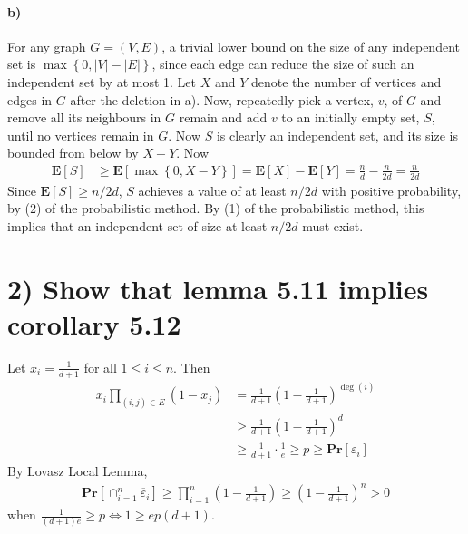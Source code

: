 \documentclass[12pt]{article}
\begin{document}
\paragraph{b)} For any graph $G=(V,E)$, a trivial lower bound on the size of any independent set is $\max\left\{0,|V| - |E|\right\}$, since each edge can reduce the size of such an independent set by at most 1. Let $X$ and $Y$ denote the number of vertices and edges in $G$ after the deletion in a). Now, repeatedly pick a vertex, $v$, of $G$ and remove all its neighbours in $G$ remain and add $v$  to an initially empty set, $S$, until no vertices remain in $G$. Now $S$ is clearly an independent set, and its size is bounded from below by $X-Y$. Now
\begin{align*}
\mathbf{E}\left[ S \right] &\geq \mathbf{E}\left[ \max\left\{0,X-Y\right\} \right] = \mathbf{E}\left[ X \right] - \mathbf{E}\left[ Y \right] = \frac{n}{d} - \frac{n}{2d} = \frac{n}{2d}
\end{align*}
Since $\mathbf{E}\left[ S \right] \geq n/2d$, $S$ achieves a value of at least $n/2d$ with positive probability, by (2) of the probabilistic method. By (1) of the probabilistic method, this implies that an independent set of size at least $n/2d$ must exist.

\section*{2) Show that lemma 5.11 implies corollary 5.12}
Let $x_i = \frac{1}{d+1}$ for all $1 \leq i \leq n$. Then
\begin{align*}
x_i\prod_{(i,j) \in E} (1-x_j) &= \frac{1}{d+1} \left( 1-\frac{1}{d+1} \right)^{\deg(i)} \\
&\geq \frac{1}{d+1} \left( 1-\frac{1}{d+1} \right)^{d} \\
&\geq \frac{1}{d+1} \cdot \frac{1}{e} \geq p \geq  \mathbf{Pr} \left[ \varepsilon_i \right]
\end{align*}
By Lovasz Local Lemma,
\begin{align*}
\mathbf{Pr} \left[ \cap_{i=1}^{n} \overline{\varepsilon}_i  \right] \geq \prod_{i=1}^n \left( 1 - \frac{1}{d+1} \right) \geq \left( 1 - \frac{1}{d+1} \right)^n > 0
\end{align*}
when $\frac{1}{(d+1)e} \geq p \Leftrightarrow 1 \geq ep(d+1)$.
\end{document}

